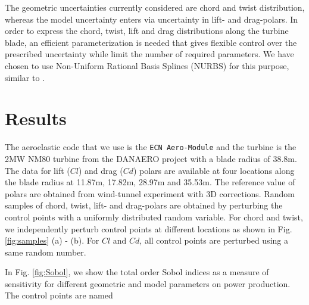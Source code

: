 \documentclass[11pt]{article}
\begin{document}
The geometric uncertainties currently considered are chord and twist distribution, whereas the model uncertainty enters via uncertainty in lift- and drag-polars. In order to express the chord, twist, lift and drag distributions along the turbine blade, an efficient parameterization is needed that gives flexible control over the prescribed uncertainty while limit the number of required parameters. We have chosen to use Non-Uniform Rational Basis Splines (NURBS) for this purpose, similar to \cite{Echeverria2017}. 

\section{Results}
The aeroelastic code that we use is the \texttt{ECN Aero-Module} \cite{Boorsma2012} and the turbine is the 2MW NM80 turbine from the DANAERO project \cite{Troldborg2013} with a blade radius of 38.8m. The data for lift ($Cl$) and drag ($Cd$) polars are available at four locations along the blade radius at 11.87m, 17.82m, 28.97m and 35.53m. The reference value of polars are obtained from wind-tunnel experiment with 3D corrections. Random samples of chord, twist, lift- and drag-polars are obtained by perturbing the control points with a uniformly distributed random variable. For chord and twist, we independently perturb control points at different locations as shown in Fig. \ref{fig:samples} (a) - (b). For $Cl$ and $Cd$, all control points are perturbed using a same random number.

In Fig. \ref{fig:Sobol}, we show the total order Sobol indices as a measure of sensitivity for different geometric and model parameters on power production. The control points are named
\end{document}
